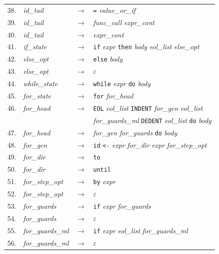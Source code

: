 \documentclass[]{ifjclass}
\begin{document}
\begin{longtable}{r l c l}
38. & \textit{id\_tail}      & $\rightarrow$ & \texttt{=} \textit{value\_or\_if} \\
39. & \textit{id\_tail}      & $\rightarrow$ & \textit{func\_call} \textit{expr\_cont} \\
40. & \textit{id\_tail}      & $\rightarrow$ & \textit{expr\_cont} \\
41. & \textit{if\_state}     & $\rightarrow$ & \texttt{if} \textit{expr} \texttt{then} \textit{body} \textit{eol\_list} \textit{else\_opt} \\
42. & \textit{else\_opt}     & $\rightarrow$ & \texttt{else} \textit{body} \\
43. & \textit{else\_opt}     & $\rightarrow$ & $\varepsilon$ \\
44. & \textit{while\_state}  & $\rightarrow$ & \texttt{while} \textit{expr} \texttt{do} \textit{body} \\
45. & \textit{for\_state}    & $\rightarrow$ & \texttt{for} \textit{for\_head} \\
46. & \textit{for\_head}     & $\rightarrow$ & \texttt{EOL} \textit{eol\_list} \texttt{INDENT} \textit{for\_gen} \textit{eol\_list} \\
    &                        &               & \textit{for\_guards\_ml} \texttt{DEDENT} \textit{eol\_list} \texttt{do} \textit{body} \\
47. & \textit{for\_head}     & $\rightarrow$ & \textit{for\_gen} \textit{for\_guards} \texttt{do} \textit{body} \\
48. & \textit{for\_gen}      & $\rightarrow$ & \texttt{id} \texttt{<-} \textit{expr} \textit{for\_dir} \textit{expr} \textit{for\_step\_opt} \\
49. & \textit{for\_dir}      & $\rightarrow$ & \texttt{to} \\
50. & \textit{for\_dir}      & $\rightarrow$ & \texttt{until} \\
51. & \textit{for\_step\_opt}& $\rightarrow$ & \texttt{by} \textit{expr} \\
52. & \textit{for\_step\_opt}& $\rightarrow$ & $\varepsilon$ \\
53. & \textit{for\_guards}   & $\rightarrow$ & \texttt{if} \textit{expr} \textit{for\_guards} \\
54. & \textit{for\_guards}   & $\rightarrow$ & $\varepsilon$ \\
55. & \textit{for\_guards\_ml}& $\rightarrow$ & \texttt{if} \textit{expr} \textit{eol\_list} \textit{for\_guards\_ml} \\
56. & \textit{for\_guards\_ml}& $\rightarrow$ & $\varepsilon$ \\

\end{longtable}
\end{document}
